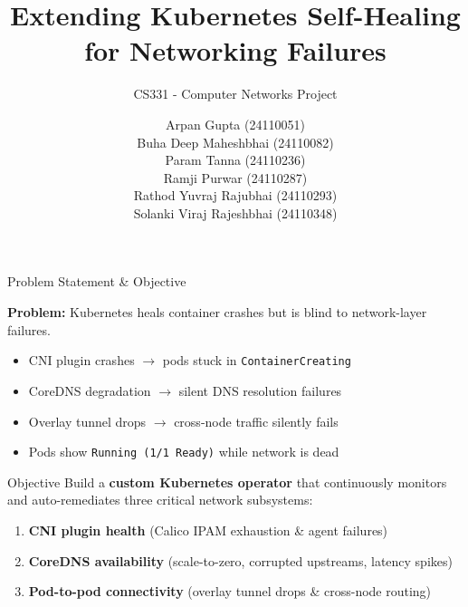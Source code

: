 \documentclass[aspectratio=169, 11pt]{beamer}
\title{Extending Kubernetes Self-Healing\\for Networking Failures}
\subtitle{CS331 - Computer Networks Project}
\author{
  Arpan Gupta (24110051) \\ 
  Buha Deep Maheshbhai (24110082) \\ 
  Param Tanna (24110236) \\  
  Ramji Purwar (24110287) \\ 
  Rathod Yuvraj Rajubhai (24110293) \\ 
  Solanki Viraj Rajeshbhai (24110348) \\
}
\date[]{}
\begin{document}
\begin{frame}[plain]
  \titlepage
\end{frame}

\begin{frame}{Problem Statement \& Objective}
\footnotesize

\textbf{Problem:} Kubernetes heals container crashes but is \alert{blind to network-layer failures}.

\begin{itemize}
  \item CNI plugin crashes $\to$ pods stuck in \texttt{ContainerCreating}
  \item CoreDNS degradation $\to$ silent DNS resolution failures
  \item Overlay tunnel drops $\to$ cross-node traffic silently fails
  \item Pods show \texttt{Running (1/1 Ready)} while network is dead
\end{itemize}

\vspace{6pt}

\begin{block}{Objective}
Build a \textbf{custom Kubernetes operator} that continuously monitors and auto-remediates three critical network subsystems:
\begin{enumerate}
  \item \textbf{CNI plugin health} (Calico IPAM exhaustion \& agent failures)
  \item \textbf{CoreDNS availability} (scale-to-zero, corrupted upstreams, latency spikes)
  \item \textbf{Pod-to-pod connectivity} (overlay tunnel drops \& cross-node routing)
\end{enumerate}
\end{block}

\end{frame}


\end{document}
